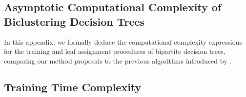 \begin{appendices}
\section{Asymptotic Computational Complexity of Biclustering Decision Trees}
\label{sec:complexity analysis}

In this appendix, we formally deduce the computational complexity expressions for the training and leaf assignment procedures of bipartite decision trees, comparing our method proposals to the previous algorithms introduced by \citet{pliakos_global_2018}.

\subsection{Training Time Complexity}
\label{sec:fit complexity analysis}


\end{appendices}
